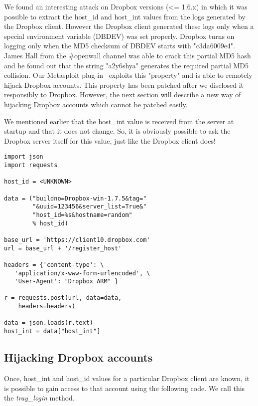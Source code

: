 \documentclass[letterpaper,twocolumn,10pt]{article}
\begin{document}
We found an interesting attack on Dropbox versions (<= 1.6.x) in which it was
possible to extract the host\_id and host\_int values from the logs generated
by the Dropbox client. However the Dropbox client generated these logs only when
a special environment variable (DBDEV) was set properly. Dropbox turns on logging
only when the MD5 checksum of DBDEV starts with "c3da6009e4". James Hall from the
\#openwall channel was able to crack this partial MD5 hash and he found out that the
string "a2y6shya" generates the required partial MD5 collision. Our Metasploit
plug-in~\cite{metasploit} exploits this "property" and is able to remotely
hijack Dropbox accounts. This property has been patched after we disclosed
it responsibly to Dropbox. However, the next section will describe a new way
of hijacking Dropbox accounts which cannot be patched easily.

We mentioned earlier that the host\_int value is received from the server at
startup and that it does not change. So, it is obviously possible to ask the
Dropbox server itself for this value, just like the Dropbox client does!

\begin{verbatim}
import json
import requests

host_id = <UNKNOWN>

data = ("buildno=Dropbox-win-1.7.5&tag="
        "&uuid=123456&server_list=True&"
        "host_id=%s&hostname=random"
        % host_id)

base_url = 'https://client10.dropbox.com'
url = base_url + '/register_host'

headers = {'content-type': \
   'application/x-www-form-urlencoded', \
   'User-Agent': "Dropbox ARM" }

r = requests.post(url, data=data,
    headers=headers)

data = json.loads(r.text)
host_int = data["host_int"]
\end{verbatim}

\subsection{Hijacking Dropbox accounts}

Once, host\_int and host\_id values for a particular Dropbox client are known,
it is possible to gain access to that account using the following code. We call
this the \emph{tray\_login} method.

\vspace{15mm}
\end{document}
